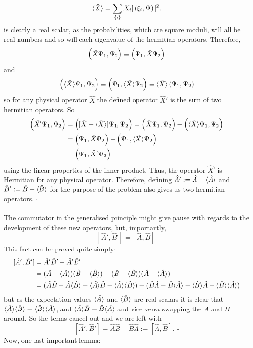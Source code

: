 $$
\langle\hat{X}\rangle=\sum_{\{i\}}X_{i}|\left(\xi_{i},\Psi\right)|^2.
$$
is clearly a real scalar, as the probabilities, which are square moduli, will all be real numbers and so will each eigenvalue of the hermitian operators. Therefore, 
$$
\left(\hat{X}\Psi_{1},\Psi_{2}\right)\equiv\left(\Psi_{1},\hat{X}\Psi_{2}\right)
$$
and 
$$
\left(\langle\hat{X}\rangle\Psi_{1},\Psi_{2}\right)\equiv\left(\Psi_{1},\langle\hat{X}\rangle\Psi_{2}\right)\equiv\langle\hat{X}\rangle\left(\Psi_{1},\Psi_{2}\right)
$$
so for any physical operator $\hat{X}$ the defined operator $\hat{X}'$ is the sum of two hermitian operators. So
$$
\begin{aligned}
\left(\hat{X}'\Psi_{1},\Psi_{2}\right)&=\left([\hat{X}-\langle\hat{X}\rangle]\Psi_{1},\Psi_{2}\right)=\left(\hat{X}\Psi_{1},\Psi_{2}\right)-\left(\langle\hat{X}\rangle\Psi_{1},\Psi_{2}\right)\\
&=\left(\Psi_{1},\hat{X}\Psi_{2}\right)-\left(\Psi_{1},\langle\hat{X}\rangle\Psi_{2}\right)\\
&=\left(\Psi_{1},\hat{X}'\Psi_{2}\right)
\end{aligned}
$$
using the linear properties of the inner product. Thus, the operator $\hat{X}'$ is Hermitian for any physical operator. Therefore, defining $\hat{A'}:=\hat{A}-\langle\hat{A}\rangle$ and $\hat{B}':=\hat{B}-\langle\hat{B}\rangle$ for the purpose of the problem also gives us two hermitian operators. $\square$
\\\\
The commutator in the generalised principle might give pause with regards to the development of these new operators, but, importantly,
$$
[\hat{A}',\hat{B}']=[\hat{A},\hat{B}].
$$
This fact can be proved quite simply:
$$
\begin{aligned}
[\hat{A}',\hat{B}']&= \hat{A}'\hat{B}'- \hat{A}'\hat{B}'\\
&= (\hat{A}-\qexp{\hat{A}})(\hat{B}-\qexp{\hat{B}})-(\hat{B}-\qexp{\hat{B}}) (\hat{A}-\qexp{\hat{A}})\\
&=(\hat{A}\hat{B}-\hat{A}\qexp{\hat{B}}-\qexp{\hat{A}}\hat{B}-\qexp{\hat{A}}\qexp{\hat{B}})-(\hat{B}\hat{A}-\hat{B}\qexp{\hat{A}}-\qexp{\hat{B}}\hat{A}-\qexp{\hat{B}}\qexp{\hat{A}})
\end{aligned}
$$
but as the expectation values $\langle\hat{A}\rangle$ and $\langle\hat{B}\rangle$ are real scalars it is clear that $\langle\hat{A}\rangle\langle\hat{B}\rangle=\langle\hat{B}\rangle\langle\hat{A}\rangle$, and $\langle\hat{A}\rangle\hat{B}=\hat{B}\langle\hat{A}\rangle$ and vice versa swapping the $A$ and $B$ around. So the terms cancel out and we are left with
$$
[\hat{A}',\hat{B}']=\hat{A}\hat{B}-\hat{B}\hat{A}:=[\hat{A},\hat{B}]. \:\:\square
$$
Now, one last important lemma:\\\\
